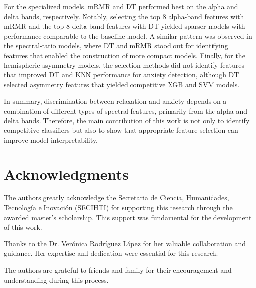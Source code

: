 \documentclass[lettersize,journal]{IEEEtran}
\begin{document}
For the specialized models, mRMR and DT performed best on the alpha and delta bands, respectively. Notably, selecting the top 8 alpha-band features with mRMR and the top 8 delta-band features with DT yielded sparser models with performance comparable to the baseline model. A similar pattern was observed in the spectral-ratio models, where DT and mRMR stood out for identifying features that enabled the construction of more compact models. Finally, for the hemispheric-asymmetry models, the selection methods did not identify features that improved DT and KNN performance for anxiety detection, although DT selected asymmetry features that yielded competitive XGB and SVM models.

In summary, discrimination between relaxation and anxiety depends on a combination of different types of spectral features, primarily from the alpha and delta bands. Therefore, the main contribution of this work is not only to identify competitive classifiers but also to show that appropriate feature selection can improve model interpretability.

\section*{Acknowledgments}
The authors greatly acknowledge the Secretaria de Ciencia, Humanidades, Tecnología e Inovación (SECIHTI) for supporting this research through the awarded master's scholarship. This support was fundamental for the development of this work.

Thanks to the Dr. Verónica Rodríguez López for her valuable collaboration and guidance. Her expertise and dedication were essential for this research.

The authors are grateful to friends and family for their encouragement and understanding during this process.



\end{document}
